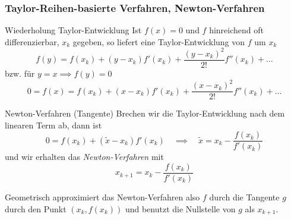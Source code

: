 \subsubsection{Taylor-Reihen-basierte Verfahren, Newton-Verfahren}

\begin{bonus}{Wiederholung Taylor-Entwicklung}
    Ist $f(x) = 0$ und $f$ hinreichend oft differenzierbar, $x_k$ gegeben, so liefert eine Taylor-Entwicklung von $f$ um $x_k$
    \[
        f(y) = f(x_k) + (y - x_k) f'(x_k) + \frac{(y - x_k)^2}{2!} f''(x_k) + \ldots
    \]
    bzw. für $y = x \implies f(y) = 0$
    \[
        0 = f(x) = f(x_k) + (x - x_k) f'(x_k) + \frac{(x - x_k)^2}{2!} f''(x_k) + \ldots
    \]
\end{bonus}

\begin{defi}{Newton-Verfahren (Tangente)}
    Brechen wir die Taylor-Entwicklung nach dem linearen Term ab, dann ist
    \[
        0 = f(x_k) + (\tilde{x} - x_k) f'(x_k) \quad \implies \quad \tilde{x} = x_k - \frac{f(x_k)}{f'(x_k)}
    \]
    und wir erhalten das \emph{Newton-Verfahren} mit
    \[
        x_{k+1} = x_k - \frac{f(x_k)}{f'(x_k)}
    \]
    
    Geometrisch approximiert das Newton-Verfahren also $f$ durch die Tangente $g$ durch den Punkt $(x_k, f(x_k))$ und benutzt die Nullstelle von $g$ als $x_{k+1}$.
\end{defi}

